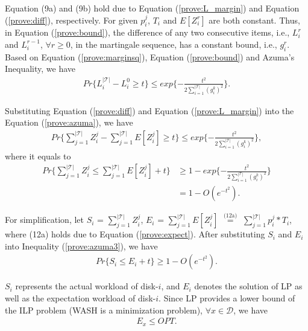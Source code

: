 \documentclass[conference]{IEEEtran}
\begin{document}
\vspace{-0.15cm}
Equation (9a) and (9b) hold due to Equation (\ref{prove:L_margin}) and Equation (\ref{prove:diff}), respectively. For given $p_i^j$, $T_i$ and $E[Z_i^r]$ are both constant. Thus, in Equation (\ref{prove:bound}), the difference of any two consecutive items, i.e., $L_i^r$ and $L_i^{r-1}$, $\forall r \geq 0$, in the martingale sequence, has a constant bound, i.e., $g_i^r$. Based on Equation (\ref{prove:marginsq}), Equation (\ref{prove:bound}) and Azuma's Inequality, we have
\vspace{-0.3cm}
\begin{align}
Pr\{L_i^{|\mathcal{T}|} - L_i^{0} \geq t\} \leq exp\{-\frac{t^2}{2\sum_{ i = 1 }^{|\mathcal{T}|}(g_i^k)^2}\}. \label{prove:azuma}
\end{align}

\vspace{-0.1cm}
Substituting Equation (\ref{prove:diff}) and Equation (\ref{prove:L_margin}) into the  Equation (\ref{prove:azuma}), we have  
\vspace{-0.2cm}
\begin{align}
Pr\{\sum\nolimits_{j = 1}^{|\mathcal{T}|} Z_i^j - 
	\sum\nolimits_{j = 1}^{|\mathcal{T}|} E[Z_i^j]\geq t\} \leq exp\{-\frac{t^2}{2\sum_{ i = 1 }^{|\mathcal{T}|}(g_i^k)^2}\},\nonumber
\end{align}
 \vspace{-0.2cm}
 where it equals to
\begin{align}
Pr\{\sum_{j = 1}^{|\mathcal{T}|} Z_i^j \leq \sum_{j = 1}^{|\mathcal{T}|} E[Z_i^j] + t\} & \geq 1 - exp\{-\frac{t^2}{2\sum_{ i = 1 }^{|\mathcal{T}|}(g_i^k)^2}\}\nonumber\\
& = 1 - O(e^{-t^2}).\label{prove:azuma3}
\end{align}

\vspace{-0.2cm}
For simplification, let $S_i$  = $\sum_{j = 1}^{|\mathcal{T}|} Z_i^j$,
$E_i$ = $\sum_{j = 1}^{|\mathcal{T}|} E[Z_i^j]$
$\overset{\text{(12a)}}{=}$
$\sum_{j = 1}^{|\mathcal{T}|} p_i^j*T_i$, where (12a) holds due to Equation (\ref{prove:expect}). After substituting $S_i$ and $E_i$ into Inequality (\ref{prove:azuma3}), we have
\vspace{-0.2cm}
\begin{align}
Pr\{S_i \leq E_i + t\} \geq 1- O(e^{-t^2}). \label{prove:SU}
\end{align}

\vspace{-0.2cm}
$S_i$ represents the actual workload of disk-$i$, and $E_i$ denotes the solution of LP as well as the expectation workload of disk-$i$. Since LP provides a lower bound of the ILP problem (WASH is a minimization problem), $\forall x \in \mathcal{D}$, we have
\vspace{-0.2cm}
\begin{align}
E_x \leq OPT.\label{prove:OPT}
\end{align}
\end{document}
